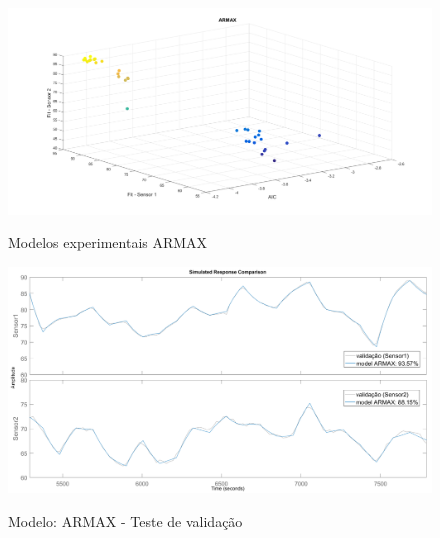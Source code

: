 \begin{apendicesenv}
\begin{figure}[h]
	\caption{Modelos experimentais ARMAX}
	\begin{center}
		\includegraphics[width=1.00\textwidth]{./5_images/tclabsp-models-ARMAX.png} 
		\label{fig:tclabsp-models-armax}
	\end{center}
	\centering
\end{figure}

\begin{figure}
	\caption{Modelo: ARMAX - Teste de validação}
	\begin{center}
		\includegraphics[width=1.00\textwidth]{./5_images/tclabsp-models-ARMAX-compare.png} 
		\label{fig:tclabsp-models-armax-compare}
	\end{center}
	\centering
\end{figure}


\end{apendicesenv}
